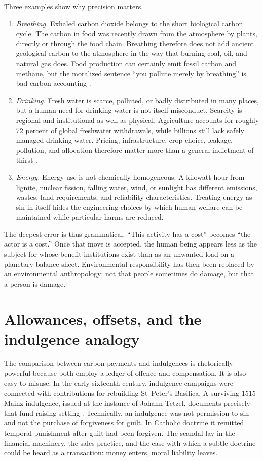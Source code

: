 ﻿\documentclass[12pt,a4paper]{book}
\begin{document}
Three examples show why precision matters.

\begin{enumerate}
\item \emph{Breathing.}  Exhaled carbon dioxide belongs to the short biological
carbon cycle.  The carbon in food was recently drawn from the atmosphere by
plants, directly or through the food chain.  Breathing therefore does not add
ancient geological carbon to the atmosphere in the way that burning coal,
oil, and natural gas does.  Food production can certainly emit fossil carbon
and methane, but the moralized sentence ``you pollute merely by breathing'' is
bad carbon accounting \cite{MITBreathingCO2}.

\item \emph{Drinking.}  Fresh water is scarce, polluted, or badly distributed
in many places, but a human need for drinking water is not itself misconduct.
Scarcity is regional and institutional as well as physical.  Agriculture
accounts for roughly 72 percent of global freshwater withdrawals, while
billions still lack safely managed drinking water.  Pricing, infrastructure,
crop choice, leakage, pollution, and allocation therefore matter more than a
general indictment of thirst \cite{UNESCOWWDR2024}.

\item \emph{Energy.}  Energy use is not chemically homogeneous.  A kilowatt-hour
from lignite, nuclear fission, falling water, wind, or sunlight has different
emissions, wastes, land requirements, and reliability characteristics.
Treating energy as sin in itself hides the engineering choices by which human
welfare can be maintained while particular harms are reduced.
\end{enumerate}

The deepest error is thus grammatical.  ``This activity has a cost'' becomes
``the actor is a cost.''  Once that move is accepted, the human being appears
less as the subject for whose benefit institutions exist than as an unwanted
load on a planetary balance sheet.  Environmental responsibility has then
been replaced by an environmental anthropology: not that people sometimes do
damage, but that a person is damage.

\section{Allowances, offsets, and the indulgence analogy}

The comparison between carbon payments and indulgences is rhetorically
powerful because both employ a ledger of offence and compensation.  It is
also easy to misuse.  In the early sixteenth century, indulgence campaigns
were connected with contributions for rebuilding St~Peter's Basilica.  A
surviving 1515 Mainz indulgence, issued at the instance of Johann Tetzel,
documents precisely that fund-raising setting \cite{EmoryIndulgence1515}.
Technically, an indulgence was not permission to sin and not the purchase of
forgiveness for guilt.  In Catholic doctrine it remitted temporal punishment
after guilt had been forgiven.  The scandal lay in the financial machinery,
the sales practice, and the ease with which a subtle doctrine could be heard
as a transaction: money enters, moral liability leaves.
\end{document}
